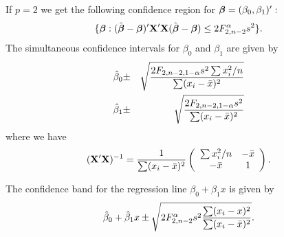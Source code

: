 If $p=2$ we get the following confidence region for $\mbox{\boldmath $\beta$} =
(\beta_0, \beta_1)':$
$$
\{\mbox{\boldmath $\beta$}:
(\hat{\mbox{\boldmath $\beta$}}-\mbox{\boldmath $\beta$})'\mathbf{X}'\mathbf{X}(\hat{\mbox{\boldmath $\beta$}}-\mbox{\boldmath $\beta$})
\leq 2F_{2,n-2}^\alpha s^2\}.
$$
The simultaneous confidence intervals for $\beta_0$ and
$\beta_1$ are given by 
\begin{eqnarray*}
\hat{\beta}_0 &\pm& \sqrt{2F_{2,n-2,1-\alpha} s^2
	\sum x_i^2/n\over\sum(x_i-\bar{x})^2}\\
\hat{\beta}_1 &\pm& \sqrt{2F_{2,n-2,1-\alpha} s^2\over
	\sum(x_i-\bar{x})^2}\\
\end{eqnarray*}
where we have
$$
(\mathbf{X}'\mathbf{X})^{-1}=
{1\over \sum(x_i-\bar{x})^2}
\left(\begin{array}{cc}
	\sum x_i^2/n&-\bar{x}\\
	-\bar{x}&1
\end{array}\right).
$$

The confidence band for the regression line $\beta_0+\beta_1 x$ is given by
$$
\hat{\beta}_0+\hat{\beta}_1 x \pm \sqrt{2F_{2,n-2}^\alpha s^2
	{\sum(x_i-x)^2\over\sum(x_i-\bar{x})^2}}.
$$

